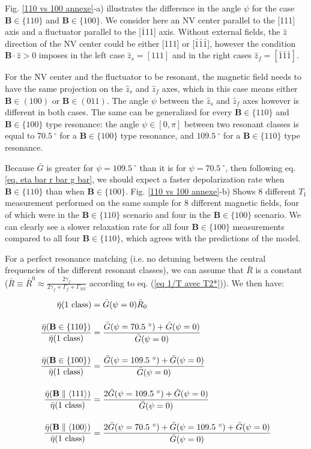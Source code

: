 \documentclass[a4paper, 11pt]{report}
\begin{document}
Fig. \ref{110 vs 100 annexe}-a) illustrates the difference in the angle $\psi$ for the case $\mathbf{B} \in \{110\}$ and $\mathbf{B} \in \{100\}$. We consider here an NV center parallel to the [111] axis and a fluctuator parallel to the [$\bar 1$11] axis. Without external fields, the $\hat z$ direction of the NV center could be either [111] or [$\bar 1 \bar 1 \bar 1$], however the condition $\mathbf{B}\cdot\hat{z} >0$ imposes in the left case $\hat z_s=[111]$ and in the right cases $\hat z_f=[\bar 1 \bar 1 \bar 1]$. 

For the NV center and the fluctuator to be resonant, the magnetic field needs to have the same projection on the $\hat z_s$ and $\hat z_f$ axes, which in this case means either $\mathbf{B} \in (100)$ or $\mathbf{B} \in (011)$. The angle $\psi$ between the $\hat z_s$ and $\hat z_f$ axes however is different in both cases. The same can be generalized for every $\mathbf{B} \in \{110\}$ and $\mathbf{B} \in \{100\}$ type resonance: the angle $\psi \in [0,\pi]$ between two resonant classes is equal to $70.5 \ ^\circ$ for a $\mathbf{B} \in \{100\}$ type resonance, and $109.5 \ ^\circ$ for a $\mathbf{B} \in \{110\}$ type resonance.

Because $\bar G$ is greater for $\psi=109.5 \ ^\circ$ than it is for $\psi=70.5 \ ^\circ$, then following eq. \ref{eq. eta bar r bar g bar}, we should expect a faster depolarization rate when $\mathbf{B} \in \{110\}$ than when $\mathbf{B} \in \{100\}$. Fig. \ref{110 vs 100 annexe}-b) Shows 8 different $T_1$ measurement performed on the same sample for 8 different magnetic fields, four of which were in the $\mathbf{B} \in \{110\}$ scenario and four in the $\mathbf{B} \in \{100\}$ scenario. We can clearly see a slower relaxation rate for all four $\mathbf{B} \in \{100\}$ measurements compared to all four $\mathbf{B} \in \{110\}$, which agrees with the predictions of the model.

For a perfect resonance matching (i.e. no detuning between the central frequencies of the different resonant classes), we can assume that $\bar R$ is a constant ($\bar R \equiv \bar R^0 \approx \frac{2 \gamma_f}{2 \gamma_f + \Gamma_f + \Gamma_{NV}}$ according to eq. (\ref{eq 1/T avec T2*})). We then have:

\begin{align}
\bar \eta(\rm{1\ class})&=\bar G(\psi=0) \bar R_0 \\[1em]
\frac{\bar \eta(\mathbf{B} \in \{110\})}{\bar \eta(\rm{1\ class})}&= \frac{\bar G(\psi=70.5 \ ^\circ)+ \bar G(\psi=0)}{\bar G(\psi=0)}\\[1em]
\frac{\bar \eta(\mathbf{B} \in \{100\})}{\bar \eta(\rm{1\ class})}&= \frac{\bar G(\psi=109.5 \ ^\circ)+ \bar G(\psi=0)}{\bar G(\psi=0)}\\[1em]
\frac{\bar \eta(\mathbf{B} \parallel \langle 111 \rangle)}{\bar \eta(\rm{1\ class})}&= \frac{2\bar G(\psi=109.5 \ ^\circ)+ \bar G(\psi=0)}{\bar G(\psi=0)}\\[1em]
\frac{\bar \eta(\mathbf{B} \parallel \langle 100 \rangle)}{\bar \eta(\rm{1\ class})}&= \frac{2\bar G(\psi=70.5 \ ^\circ)+ \bar G(\psi=109.5 \ ^\circ) + \bar G(\psi=0)}{\bar G(\psi=0)}
\end{align} 
\end{document}
